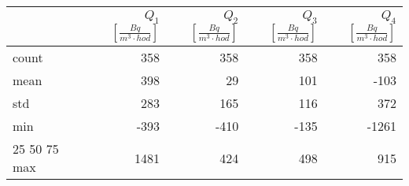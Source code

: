 \begin{tabular}{lrrrr}
\toprule
{} &  $Q_1$ $\left[\si{\frac{Bq}{m^3\cdot hod}}\right]$ &  $Q_2$ $\left[\si{\frac{Bq}{m^3\cdot hod}}\right]$ &  $Q_3$ $\left[\si{\frac{Bq}{m^3\cdot hod}}\right]$ &  $Q_4$ $\left[\si{\frac{Bq}{m^3\cdot hod}}\right]$ \\
\midrule
count &                                                358 &                                                358 &                                                358 &                                                358 \\
mean  &                                                398 &                                                 29 &                                                101 &                                               -103 \\
std   &                                                283 &                                                165 &                                                116 &                                                372 \\
min   &                                               -393 &                                               -410 &                                               -135 &                                              -1261 \\
25%
50%
75%
max   &                                               1481 &                                                424 &                                                498 &                                                915 \\
\bottomrule
\end{tabular}

